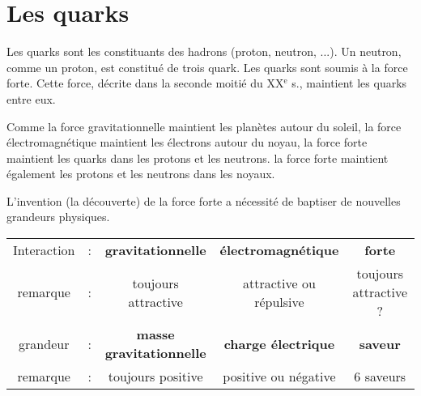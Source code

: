 \section{Les quarks}

Les quarks sont les constituants des hadrons (proton, neutron, ...). Un neutron, comme un proton, est constitué de trois quark. Les quarks sont soumis à la force forte. Cette force, décrite dans la seconde moitié du {\footnotesize XX}$^\text{e}$ s., maintient les quarks entre eux.

Comme la force gravitationnelle maintient les planètes autour du soleil, la force électromagnétique maintient les électrons autour du noyau, la force forte maintient les quarks dans les protons et les neutrons. la force forte maintient également les protons et les neutrons dans les noyaux.

L'invention (la découverte) de la force forte a nécessité de baptiser de nouvelles grandeurs physiques.


\begin{center}
{\large\begin{tabular}{ccccc}
{\sf Interaction} & : & {\bf gravitationnelle} & {\bf électromagnétique} & {\bf forte} \\
{\sf remarque} & : & toujours attractive & attractive ou répulsive & toujours attractive ? \\
{\sf grandeur} & : & {\bf masse gravitationnelle} & {\bf charge électrique} & {\bf saveur} \\
{\sf remarque} & : & toujours positive & positive ou négative & 6 saveurs \\
\end{tabular}}
\end{center}

